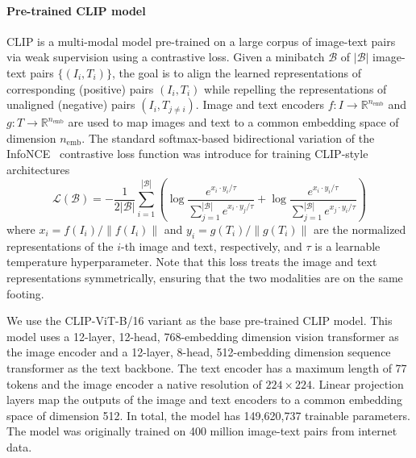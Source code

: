 \documentclass[10pt]{article} %
\begin{document}
\paragraph*{Pre-trained CLIP model}

CLIP \citep[Contrastive Language-Image Pretraining;][]{radford2021learning} is a multi-modal model pre-trained on a large corpus of image-text pairs via weak supervision using a contrastive loss. Given a minibatch $\mathcal{B}$ of $|\mathcal{B}|$ image-text pairs $\{(I_i, T_i)\}$, the goal is to align the learned representations of corresponding (positive) pairs $(I_i, T_i)$ while repelling the representations of unaligned (negative) pairs $(I_i, T_{j\neq i})$. Image and text encoders $f: I \rightarrow \mathbb R^{n_\text{emb}}$ and $g: T \rightarrow \mathbb R^{n_\text{emb}}$ are used to map images and text to a common embedding space of dimension $n_\text{emb}$. The standard softmax-based bidirectional variation of the InfoNCE~\citep{oord2018representation} contrastive loss function was introduce for training CLIP-style architectures\citep{radford2021learning}
\begin{equation}
  \mathcal{L}(\mathcal{B})=-\frac{1}{2|\mathcal{B}|} \sum_{i=1}^{|\mathcal{B}|}\left(\log \frac{e^{x_i \cdot y_i / \tau}}{\sum_{j=1}^{|\mathcal{B}|} e^{x_i \cdot y_j / \tau}}+\log \frac{e^{x_i \cdot y_i / \tau}}{\sum_{j=1}^{|\mathcal{B}|} e^{x_j \cdot y_i / \tau}}\right)\label{eq:softmax_loss}
\end{equation}
where ${x}_i={f\left(I_i\right)}/{\left\|f\left(I_i\right)\right\|}$ and ${y}_i={g\left(T_i\right)}/{\left\|g\left(T_i\right)\right\|}$ are the normalized representations of the $i$-th image and text, respectively, and $\tau$ is a learnable temperature hyperparameter. Note that this loss treats the image and text representations symmetrically, ensuring that the two modalities are on the same footing.

We use the CLIP-ViT-B/16 \citep{radford2021learning} variant as the base pre-trained CLIP model. This model uses a 12-layer, 12-head, 768-embedding dimension vision transformer as the image encoder and a 12-layer, 8-head, 512-embedding dimension sequence transformer as the text backbone. The text encoder has a maximum length of 77 tokens and the image encoder a native resolution of $224\times224$. Linear projection layers map the outputs of the image and text encoders to a common embedding space of dimension 512. In total, the model has 149,620,737 trainable parameters. The model was originally trained on 400 million image-text pairs from internet data. 
\end{document}
